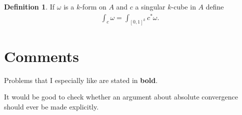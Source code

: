 \documentclass[20pt]{article}
\theoremstyle{plain}
\theoremstyle{definition}
\newtheorem{definition}{Definition}
\begin{document}
\begin{definition}
	If $\omega$ is a $k$-form on $A$ and $c$ a singular $k$-cube in $A$ define
	\begin{align*}
		\int_c \omega = \int_{[0,1]^k}c^*\omega.
	\end{align*}
\end{definition}






























































\section{Comments}

Problems that I especially like are stated in \textbf{bold}.

It would be good to check whether an argument about absolute convergence should ever be made explicitly.
\end{document}
